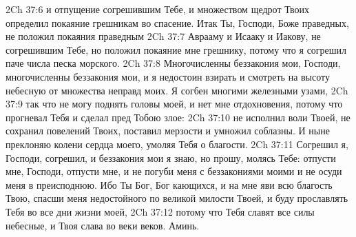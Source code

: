 \vs 2Ch 37:6 и отпущение согрешившим Тебе, и множеством щедрот Твоих определил покаяние грешникам во спасение. Итак Ты, Господи, Боже праведных, не положил покаяния праведным
\vs 2Ch 37:7 Аврааму и Исааку и Иакову, не согрешившим Тебе, но положил покаяние мне грешнику, потому что я согрешил паче числа песка морского.
\vs 2Ch 37:8 Многочисленны беззакония мои, Господи, многочисленны беззакония мои, и я недостоин взирать и смотреть на высоту небесную от множества неправд моих. Я согбен многими железными узами,
\vs 2Ch 37:9 так что не могу поднять головы моей, и нет мне отдохновения, потому что прогневал Тебя и сделал пред Тобою злое:
\vs 2Ch 37:10 не исполнил воли Твоей, не сохранил повелений Твоих, поставил мерзости и умножил соблазны. И ныне преклоняю колени сердца моего, умоляя Тебя о благости.
\vs 2Ch 37:11 Согрешил я, Господи, согрешил, и беззакония мои я знаю, но прошу, молясь Тебе: отпусти мне, Господи, отпусти мне, и не погуби меня с беззакониями моими и не осуди меня в преисподнюю. Ибо Ты Бог, Бог кающихся, и на мне яви всю благость Твою, спасши меня недостойного по великой милости Твоей, и буду прославлять Тебя во все дни жизни моей,
\vs 2Ch 37:12 потому что Тебя славят все силы небесные, и Твоя слава во веки веков. Аминь.
